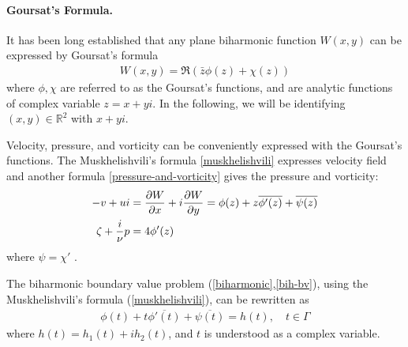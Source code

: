 \documentclass[10pt,twocolumn]{article}
\begin{document}
\paragraph*{Goursat's Formula.} It has been long established that any plane biharmonic function $W(x,y)$ can be expressed by Goursat's formula 
\begin{align}
  W(x,y) = \Re (\bar z \phi(z) + \chi (z)) \label{Goursat}
\end{align}
where $\phi, \chi$ are referred to as the Goursat's functions, and are analytic functions of complex variable $z = x+yi$.
In the following, we will be identifying $(x,y) \in \mathbb{R}^2$ with $x + yi$. 

Velocity, pressure, and vorticity can be conveniently expressed with the Goursat's functions. 
The Muskhelishvili's formula \eqref{muskhelishvili} 
expresses velocity field and another formula \eqref{pressure-and-vorticity} gives the pressure and vorticity:
\begin{align}
  -v + ui &= \pdv{W}{x} + i\pdv{W}{y} 
    = \phi(z) + z \overline{\phi'(z)} + \overline{\psi(z)}
    \label{muskhelishvili}\\
   \zeta + \frac{i}{\nu}p &= 4\phi'(z) \label{pressure-and-vorticity}
\end{align} where $\psi = \chi'$ \cite{muskhelishviliBasicProblemsMathematical1977}. 

The biharmonic boundary value problem (\ref{biharmonic},\ref{bih-bv}), 
using the Muskhelishvili's formula (\ref{muskhelishvili}), can be rewritten as
\begin{align}
  \phi(t) + t\overline{\phi'(t)} + \overline{\psi(t)} 
  = h(t), \quad
  t \in \Gamma
\end{align} where $h(t) =  h_1(t) + ih_2(t)$,  and $t$ is understood as a complex variable. 
\end{document}
